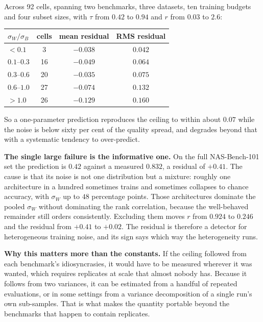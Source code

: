 \documentclass[11pt]{article}
\begin{document}
Across 92 cells, spanning two benchmarks, three datasets, ten training budgets and four subset sizes,
with $\tau$ from $0.42$ to $0.94$ and $r$ from $0.03$ to $2.6$:

\begin{center}\small
\begin{tabular}{lccc}
\toprule
$\sigma_W/\sigma_B$ & cells & mean residual & RMS residual \\
\midrule
$<0.1$      & 3  & $-0.038$ & $0.042$ \\
$0.1$--$0.3$ & 16 & $-0.049$ & $0.064$ \\
$0.3$--$0.6$ & 20 & $-0.035$ & $0.075$ \\
$0.6$--$1.0$ & 27 & $-0.074$ & $0.132$ \\
$>1.0$      & 26 & $-0.129$ & $0.160$ \\
\bottomrule
\end{tabular}
\end{center}

So a one-parameter prediction reproduces the ceiling to within about $0.07$ while the noise is below
sixty per cent of the quality spread, and degrades beyond that with a systematic tendency to
over-predict.

\textbf{The single large failure is the informative one.} On the full NAS-Bench-101 set the prediction is
$0.42$ against a measured $0.832$, a residual of $+0.41$. The cause is that its noise is not one
distribution but a mixture: roughly one architecture in a hundred sometimes trains and sometimes
collapses to chance accuracy, with $\sigma_W$ up to $48$ percentage points. Those architectures dominate
the pooled $\sigma_W$ without dominating the rank correlation, because the well-behaved remainder still
orders consistently. Excluding them moves $r$ from $0.924$ to $0.246$ and the residual from $+0.41$ to
$+0.02$. The residual is therefore a detector for heterogeneous training
noise, and its sign says which way the heterogeneity runs.

\textbf{Why this matters more than the constants.} If the ceiling followed from each benchmark's
idiosyncrasies, it would have to be measured wherever it was wanted, which requires replicates at scale
that almost nobody has. Because it follows from two variances, it can be estimated from a handful of
repeated evaluations, or in some settings from a variance decomposition of a single run's own
sub-samples. That is what makes the quantity portable beyond the benchmarks that happen to contain
replicates.
\end{document}
